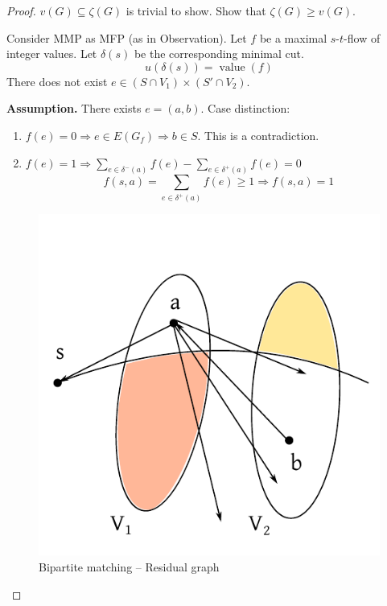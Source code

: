 \documentclass{article}
\newcommand{\flow}[2]{$#1$-$#2$-flow}
\begin{document}
\begin{proof}
  $v(G) \subseteq \zeta(G)$ is trivial to show. Show that $\zeta(G) \geq v(G)$.

  Consider MMP as MFP (as in Observation). Let $f$ be a maximal \flow st of integer values.
  Let $\delta(s)$ be the corresponding minimal cut.
  \[ u(\delta(s)) = \operatorname{value}(f) \]
  There does not exist $e \in (S \cap V_1) \times (S' \cap V_2)$.

  \textbf{Assumption.} There exists $e = (a, b)$. Case distinction:
  \begin{enumerate}
    \item $f(e) = 0 \Rightarrow e \in E(G_f) \Rightarrow b \in S$. This is a contradiction.
    \item $f(e) = 1 \Rightarrow \sum_{e \in \delta^-(a)} f(e) - \sum_{e \in \delta^+(a)} f(e) = 0$
      \[ f(s, a) = \sum_{e \in \delta^+(a)} f(e) \geq 1 \Rightarrow f(s, a) = 1 \]
  \end{enumerate}

  \begin{figure}[ht]
   \begin{center}
    \includegraphics{img/bipartite_increment.pdf}
    \caption{Bipartite matching -- Residual graph}
   \end{center}
  \end{figure}


\end{proof}
\end{document}
